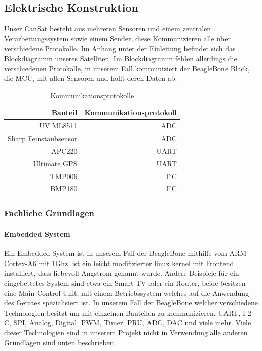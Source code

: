 \subsection{Elektrische Konstruktion}
Unser CanSat besteht aus mehreren Sensoren und einem zentralen Verarbeitungssystem sowie einem Sender, diese Kommunizieren alle über verschiedene Protokolle. Im Anhang unter der Einleitung befindet sich das Blockdiagramm unseres Satelliten. Im Blockdiagramm fehlen allerdings die verschiedenen Protokolle, in unserem Fall kommuniziert der BeagleBone Black, die MCU, mit allen Sensoren und hollt deren Daten ab.

\begin{table}[H]
  \centering
    \begin{tabular}{rr}
    \toprule
    \textbf{Bauteil} & \textbf{Kommunikationsprotokoll} \\
    \midrule 
    UV ML8511 & ADC \\
    Sharp Feinstaubsensor & ADC \\
    APC220 & UART \\
    Ultimate GPS & UART \\
    TMP006 & I²C \\
    BMP180 & I²C \\
    \bottomrule
    \end{tabular}
    \caption{Kommunikationsprotokolle}
\end{table}

\subsubsection{Fachliche Grundlagen}
\paragraph{Embedded System}
Ein Embedded System ist in unserem Fall der BeagleBone mithilfe vom ARM Cortex-A6 mit 1Ghz, ist ein leicht modifizierter linux kernel mit Frontend installiert, dass liebevoll Angstrom genannt wurde. Andere Beispiele für ein eingebettetes System sind etwa ein Smart TV oder ein Router, beide besitzen eine Main Control Unit, mit einem Betriebssystem welches auf die Anwendung des Gerätes spezialisiert ist. In unserem Fall der BeagleBone welcher verschiedene Technologien besitzt um mit einzelnen Bauteilen zu kommunizieren. UART, I-2-C, SPI, Analog, Digital, PWM, Timer, PRU, ADC, DAC und viele mehr. Viele dieser Technologien sind in unserem Projekt nicht in Verwendung alle anderen Grundlagen sind unten beschrieben.

